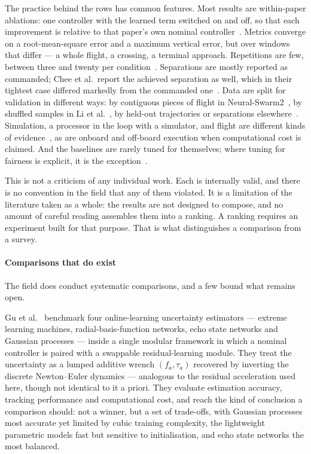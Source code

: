 The practice behind the rows has common features. Most results are within-paper ablations: one
controller with the learned term switched on and off, so that each improvement is relative to that
paper's own nominal
controller~\cite{shi2020neuralswarm,shi2022neuralswarm2,chee2024knodedwmpc,li2023ndpnmpc,hsieh2026flatness}.
Metrics converge on a root-mean-square error and a maximum vertical error, but over windows that
differ --- a whole flight, a crossing, a terminal approach. Repetitions are few, between three and
twenty per condition~\cite{li2023ndpnmpc,shi2020neuralswarm,hsieh2026flatness,shankar2023docking,cobobriesewitz2026lindi}.
Separations are mostly reported as commanded; Chee et al.\ report the achieved separation as well,
which in their tightest case differed markedly from the commanded one~\cite{chee2024knodedwmpc}.
Data are split for validation in different ways: by contiguous pieces of flight in
Neural-Swarm2~\cite{shi2022neuralswarm2}, by shuffled samples in Li et al.~\cite{li2023ndpnmpc}, by
held-out trajectories or separations
elsewhere~\cite{cobobriesewitz2026lindi,hsieh2026flatness}. Simulation, a processor in the loop with
a simulator, and flight are different kinds of evidence~\cite{gu2025comparative,yang2025flatnessresiduals},
as are onboard and off-board execution when computational cost is claimed. And the baselines are
rarely tuned for themselves; where tuning for fairness is explicit, it is the exception~\cite{gu2025comparative}.

This is not a criticism of any individual work. Each is internally valid, and there is no
convention in the field that any of them violated. It is a limitation of the literature taken as a
whole: the results are not designed to compose, and no amount of careful reading assembles them
into a ranking. A ranking requires an experiment built for that purpose. That is what distinguishes
a comparison from a survey.

\label{sec:rw-existing-comparisons}
\paragraph{Comparisons that do exist}

The field does conduct systematic comparisons, and a few bound what remains open.

Gu et al.~\cite{gu2025comparative} benchmark four online-learning uncertainty estimators ---
extreme learning machines, radial-basis-function networks, echo state networks and Gaussian
processes --- inside a single modular framework in which a nominal controller is paired with a
swappable residual-learning module. They treat the uncertainty as a lumped additive wrench
\((f_a, \tau_a)\) recovered by inverting the discrete Newton--Euler dynamics --- analogous to the
residual acceleration used here, though not identical to it a priori. They evaluate estimation accuracy, tracking
performance and computational cost, and reach the kind of conclusion a comparison should: not a
winner, but a set of trade-offs, with Gaussian processes most accurate yet limited by cubic
training complexity, the lightweight parametric models fast but sensitive to initialisation, and
echo state networks the most balanced.

